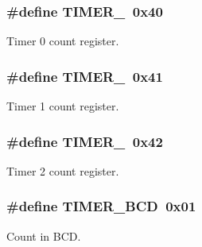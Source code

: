\subsubsection[{\texorpdfstring{T\+I\+M\+E\+R\+\_\+0}{TIMER_0}}]{\setlength{\rightskip}{0pt plus 5cm}\#define T\+I\+M\+E\+R\+\_~0x40}\hypertarget{group__i8254_gacc9ff9df4a9674a1ce9ba08fc4a4679e}{}\label{group__i8254_gacc9ff9df4a9674a1ce9ba08fc4a4679e}


Timer 0 count register. 

\subsubsection[{\texorpdfstring{T\+I\+M\+E\+R\+\_\+1}{TIMER_1}}]{\setlength{\rightskip}{0pt plus 5cm}\#define T\+I\+M\+E\+R\+\_~0x41}\hypertarget{group__i8254_gac62c99c2a9289891c1b83052242cca49}{}\label{group__i8254_gac62c99c2a9289891c1b83052242cca49}


Timer 1 count register. 

\subsubsection[{\texorpdfstring{T\+I\+M\+E\+R\+\_\+2}{TIMER_2}}]{\setlength{\rightskip}{0pt plus 5cm}\#define T\+I\+M\+E\+R\+\_~0x42}\hypertarget{group__i8254_ga1f34f18ad0ab8cace46b615773b48735}{}\label{group__i8254_ga1f34f18ad0ab8cace46b615773b48735}


Timer 2 count register. 

\subsubsection[{\texorpdfstring{T\+I\+M\+E\+R\+\_\+\+B\+CD}{TIMER_BCD}}]{\setlength{\rightskip}{0pt plus 5cm}\#define T\+I\+M\+E\+R\+\_\+\+B\+CD~0x01}\hypertarget{group__i8254_ga325b992a371d5d981c4eceff42fa5956}{}\label{group__i8254_ga325b992a371d5d981c4eceff42fa5956}


Count in B\+CD. 

